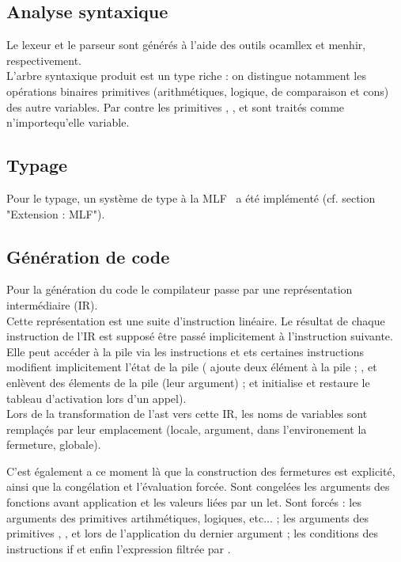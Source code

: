 \documentclass[a4paper]{article}
\begin{document}
\subsection{Analyse syntaxique}
Le lexeur et le parseur sont générés à l'aide des outils ocamllex et menhir, respectivement. \\
L'arbre syntaxique produit est un type riche : on distingue notamment les opérations binaires primitives (arithmétiques, logique, de comparaison et cons) des autre variables. Par contre les primitives , ,  et  sont traités comme n'importequ'elle variable.

\subsection{Typage}
Pour le typage, un système de type \og à la MLF \fg ~a été implémenté
(cf. section "Extension : MLF"). %

\subsection{Génération de code}
Pour la génération du code le compilateur passe par une représentation intermédiaire (IR). \\
Cette représentation est une suite d'instruction linéaire. Le résultat de chaque instruction de l'IR est supposé être passé implicitement à l'instruction suivante. \\
Elle peut accéder à la pile via les instructions  et  ets certaines instructions modifient implicitement l'état de la pile ( ajoute deux élément à la pile ; ,  et  enlèvent des élements de la pile (leur argument) ;  et  initialise et restaure le tableau d'activation lors d'un appel). \\
Lors de la transformation de l'ast vers cette IR, les noms de
variables sont remplaçés par leur emplacement (locale, argument, dans
l'environement la fermeture, globale).

C'est également a ce moment là que la construction des fermetures est
explicité, ainsi que la congélation et l'évaluation forcée. Sont
congelées les arguments des fonctions avant application et les valeurs
liées par un let. Sont forcés : les arguments des primitives
artihmétiques, logiques, etc... ; les arguments des primitives
, ,  et  lors de
l'application du dernier argument ; les conditions des instructions if
et enfin l'expression filtrée par .
\end{document}
